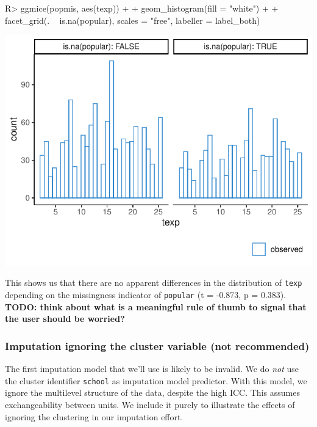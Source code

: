 \documentclass[
]{jss}
\begin{document}
\begin{CodeChunk}
\begin{CodeInput}
R> ggmice(popmis, aes(texp)) +
+   geom_histogram(fill = "white") +
+   facet_grid(. ~ is.na(popular), scales = "free", labeller = label_both)
\end{CodeInput}


\begin{center}\includegraphics{Imputation_of_Incomplete_Multilevel_Data_files/figure-latex/pop-hist-1} \end{center}

\end{CodeChunk}

This shows us that there are no apparent differences in the distribution
of \texttt{texp} depending on the missingness indicator of
\texttt{popular} (t = -0.873, p = 0.383). \textbf{TODO: think about what
is a meaningful rule of thumb to signal that the user should be
worried?}

\hypertarget{imputation-ignoring-the-cluster-variable-not-recommended}{%
\subsubsection{Imputation ignoring the cluster variable (not
recommended)}\label{imputation-ignoring-the-cluster-variable-not-recommended}}

The first imputation model that we'll use is likely to be invalid. We do
\emph{not} use the cluster identifier \texttt{school} as imputation
model predictor. With this model, we ignore the multilevel structure of
the data, despite the high ICC. This assumes exchangeability between
units. We include it purely to illustrate the effects of ignoring the
clustering in our imputation effort.
\end{document}
